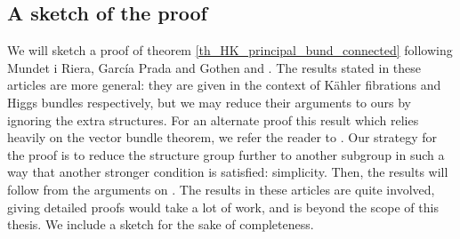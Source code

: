 \subsection{A sketch of the proof}
{\color{violet}
We will sketch a proof of theorem \ref{th_HK_principal_bund_connected} following Mundet i Riera, García Prada and Gothen \parencite{i1999hitchin} and \parencite{garcia2009hitchin}. The results stated in these articles are more general: they are given in the context of Kähler fibrations and Higgs bundles respectively, but we may reduce their arguments to ours by ignoring the extra structures. For an alternate proof this result which relies heavily on the vector bundle theorem, we refer the reader to \parencite{anchouche2001einstein}. Our strategy for the proof is to reduce the structure group further to another subgroup in such a way that another stronger condition is satisfied: simplicity. Then, the results will follow from the arguments on \parencite{i1999hitchin}. The results in these articles are quite involved, giving detailed proofs would take a lot of work, and is beyond the scope of this thesis. We include a sketch for the sake of completeness.  \\


}
